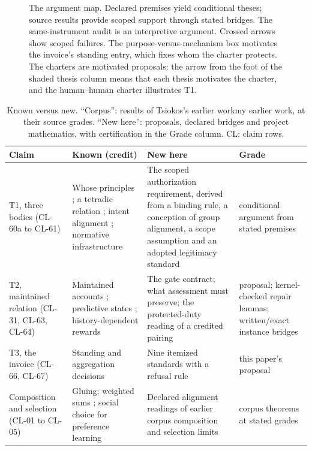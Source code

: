 \documentclass[pdflatex,sn-basic]{sn-jnl}%
\newcommand{\tablerows}{\renewcommand{\arraystretch}{1.6}}%
\newcommand{\renderchoice}[2]{\ifanonymous#2\else#1\fi}%
\begin{document}
\begin{appendices}
\begin{figure}[p]
  \centering
  
  \caption{The argument map. Declared premises yield conditional theses; source results provide scoped support through stated bridges. The same-instrument audit is an interpretive argument. Crossed arrows show scoped failures. The purpose-versus-mechanism box motivates the invoice's standing entry, which fixes whom the charter protects. The charters are motivated proposals: the arrow from the foot of the shaded thesis column means that each thesis motivates the charter, and the human--human charter illustrates T1.}
  \label{fig:argument-map}
\end{figure}
\begin{table}[htbp]
  \centering\footnotesize
  \caption{Known versus new. ``Corpus'': results of \renderchoice{my earlier work}{Tsiokos's earlier work}, at their source grades. ``New here'': proposals, declared bridges and project mathematics, with certification in the Grade column. CL: claim rows.}
  \label{tab:claims}
  \tablerows
  \begin{tabularx}{\textwidth}{@{}>{\raggedright\arraybackslash}p{2.7cm}>{\raggedright\arraybackslash}X>{\raggedright\arraybackslash}X>{\raggedright\arraybackslash}p{3.0cm}@{}}
    \toprule
    Claim & Known (credit) & New here & Grade \\
    \midrule
    T1, three bodies (CL-60a to CL-61) & Whose principles \citep{gabriel2020}; a tetradic relation \citep{gabriel2024assistants}; intent alignment \citep{christiano2018clarifying}; normative infrastructure \citep{hadfieldmenell2019incomplete} & The scoped authorization requirement, derived from a binding rule, a conception of group alignment, a scope assumption and an adopted legitimacy standard & conditional argument from stated premises \\
    T2, maintained relation (CL-31, CL-63, CL-64) & Maintained accounts \citep{rahwan2018,zhixuan2025}; predictive states \citep{shalizi2001}; history-dependent rewards \citep{bacchus1996,toroicarte2018} & The gate contract; what assessment must preserve; the protected-duty reading of a credited pairing & proposal; kernel-checked repair lemmas; written/exact instance bridges \\
    T3, the invoice (CL-66, CL-67) & Standing and aggregation decisions \citep{baum2020} & Nine itemized standards with a refusal rule & this paper's proposal \\
    Composition and selection (CL-01 to CL-05) & Gluing; weighted sums \citep{ehrgott2005,harsanyi1955}; social choice for preference learning \citep{conitzer2024,ge2024} & Declared alignment readings of earlier corpus composition and selection limits & corpus theorems at stated grades \\

\end{tabularx}
\end{table}
\end{appendices}
\end{document}
